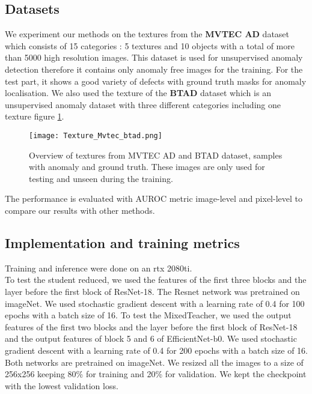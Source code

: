 \documentclass[a4paper,twoside]{article}
\begin{document}
\subsection{Datasets}
We experiment our methods on the textures from the  \textbf{MVTEC AD} \citep{bergmann_mvtec_2019} dataset which consists of 15 categories : 5 textures and 10 objects with a total of more than 5000 high resolution images. This dataset is used for unsupervised anomaly detection therefore it contains only anomaly free images for the training. For the test part, it shows a good variety of defects with ground truth masks for anomaly localisation. 
We also used the texture of the  \textbf{BTAD} \citep{mishra_vt-adl_2021} dataset which is an unsupervised anomaly dataset with three different categories including one texture figure \ref{Fig.4}.

\begin{figure}[h]
\centerline{\texttt{[image: Texture\_Mvtec\_btad.png]}}
\renewcommand{\arraystretch}{1}
\captionsetup{justification=centering}
\caption{ 
Overview of textures from MVTEC AD and BTAD dataset, samples with anomaly and ground truth. These images are only used for testing and unseen during the training.}
\label{Fig.4}
\end{figure}


The performance is evaluated with AUROC metric image-level and pixel-level to compare our results with other methods. 



\subsection{Implementation and training metrics}
Training and inference were done on an rtx 2080ti. \\
To test the student reduced, we used the features of the first three blocks and the layer before the first block of ResNet-18. The Resnet network was pretrained on imageNet. We used stochastic gradient descent with a learning rate of 0.4 for 100 epochs with a batch size of 16. To test the MixedTeacher, we used the output features of the first two blocks and the layer before the first block of ResNet-18 and the output features of block 5 and 6 of EfficientNet-b0. We used stochastic gradient descent with a learning rate of 0.4 for 200 epochs with a batch size of 16. Both networks are pretrained on imageNet.
We resized all the images to a size of 256x256 keeping 80\% for training and 20\% for validation. We kept the checkpoint with the lowest validation loss.
\end{document}
